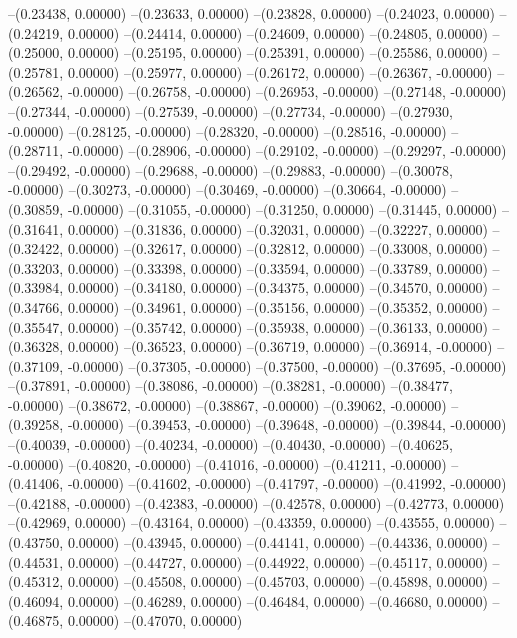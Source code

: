 --(0.23438, 0.00000)
--(0.23633, 0.00000)
--(0.23828, 0.00000)
--(0.24023, 0.00000)
--(0.24219, 0.00000)
--(0.24414, 0.00000)
--(0.24609, 0.00000)
--(0.24805, 0.00000)
--(0.25000, 0.00000)
--(0.25195, 0.00000)
--(0.25391, 0.00000)
--(0.25586, 0.00000)
--(0.25781, 0.00000)
--(0.25977, 0.00000)
--(0.26172, 0.00000)
--(0.26367, -0.00000)
--(0.26562, -0.00000)
--(0.26758, -0.00000)
--(0.26953, -0.00000)
--(0.27148, -0.00000)
--(0.27344, -0.00000)
--(0.27539, -0.00000)
--(0.27734, -0.00000)
--(0.27930, -0.00000)
--(0.28125, -0.00000)
--(0.28320, -0.00000)
--(0.28516, -0.00000)
--(0.28711, -0.00000)
--(0.28906, -0.00000)
--(0.29102, -0.00000)
--(0.29297, -0.00000)
--(0.29492, -0.00000)
--(0.29688, -0.00000)
--(0.29883, -0.00000)
--(0.30078, -0.00000)
--(0.30273, -0.00000)
--(0.30469, -0.00000)
--(0.30664, -0.00000)
--(0.30859, -0.00000)
--(0.31055, -0.00000)
--(0.31250, 0.00000)
--(0.31445, 0.00000)
--(0.31641, 0.00000)
--(0.31836, 0.00000)
--(0.32031, 0.00000)
--(0.32227, 0.00000)
--(0.32422, 0.00000)
--(0.32617, 0.00000)
--(0.32812, 0.00000)
--(0.33008, 0.00000)
--(0.33203, 0.00000)
--(0.33398, 0.00000)
--(0.33594, 0.00000)
--(0.33789, 0.00000)
--(0.33984, 0.00000)
--(0.34180, 0.00000)
--(0.34375, 0.00000)
--(0.34570, 0.00000)
--(0.34766, 0.00000)
--(0.34961, 0.00000)
--(0.35156, 0.00000)
--(0.35352, 0.00000)
--(0.35547, 0.00000)
--(0.35742, 0.00000)
--(0.35938, 0.00000)
--(0.36133, 0.00000)
--(0.36328, 0.00000)
--(0.36523, 0.00000)
--(0.36719, 0.00000)
--(0.36914, -0.00000)
--(0.37109, -0.00000)
--(0.37305, -0.00000)
--(0.37500, -0.00000)
--(0.37695, -0.00000)
--(0.37891, -0.00000)
--(0.38086, -0.00000)
--(0.38281, -0.00000)
--(0.38477, -0.00000)
--(0.38672, -0.00000)
--(0.38867, -0.00000)
--(0.39062, -0.00000)
--(0.39258, -0.00000)
--(0.39453, -0.00000)
--(0.39648, -0.00000)
--(0.39844, -0.00000)
--(0.40039, -0.00000)
--(0.40234, -0.00000)
--(0.40430, -0.00000)
--(0.40625, -0.00000)
--(0.40820, -0.00000)
--(0.41016, -0.00000)
--(0.41211, -0.00000)
--(0.41406, -0.00000)
--(0.41602, -0.00000)
--(0.41797, -0.00000)
--(0.41992, -0.00000)
--(0.42188, -0.00000)
--(0.42383, -0.00000)
--(0.42578, 0.00000)
--(0.42773, 0.00000)
--(0.42969, 0.00000)
--(0.43164, 0.00000)
--(0.43359, 0.00000)
--(0.43555, 0.00000)
--(0.43750, 0.00000)
--(0.43945, 0.00000)
--(0.44141, 0.00000)
--(0.44336, 0.00000)
--(0.44531, 0.00000)
--(0.44727, 0.00000)
--(0.44922, 0.00000)
--(0.45117, 0.00000)
--(0.45312, 0.00000)
--(0.45508, 0.00000)
--(0.45703, 0.00000)
--(0.45898, 0.00000)
--(0.46094, 0.00000)
--(0.46289, 0.00000)
--(0.46484, 0.00000)
--(0.46680, 0.00000)
--(0.46875, 0.00000)
--(0.47070, 0.00000)
